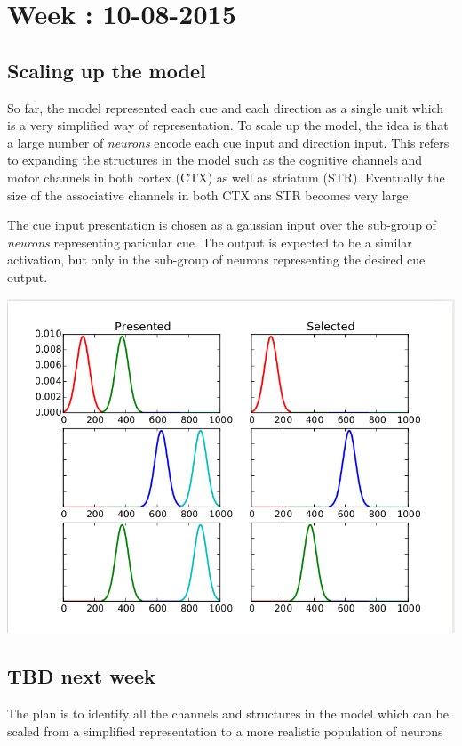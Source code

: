 \documentclass[11pt]{article}
\begin{document}
\section{Week : 10-08-2015}
\subsection{Scaling up the model}
So far, the model represented each cue and each direction as a single unit which is a very simplified way of representation. To scale up the model, the idea is that a large number of \emph{neurons} encode each cue input and direction input. This refers to expanding the structures in the model such as the cognitive channels and motor channels in both cortex (CTX) as well as striatum (STR). Eventually the size of the associative channels in both CTX ans STR becomes very large.\par
The cue input presentation is chosen as a gaussian input over the sub-group of \emph{neurons} representing paricular cue. The output is expected to be a similar activation, but only in the sub-group of neurons representing the desired cue output.\\
\par
\includegraphics[clip=true, trim=40 35 0 35, scale=.5]{pop_inputs.png}
\subsection{TBD next week}
The plan is to identify all the channels and structures in the model which can be scaled from a simplified representation to a more realistic population of neurons
\end{document}
